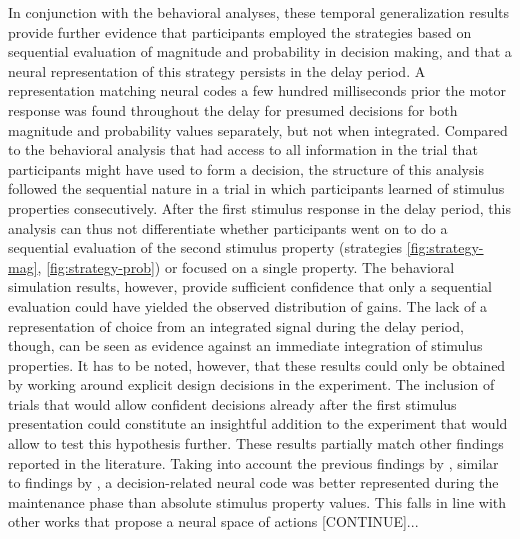 In conjunction with the behavioral analyses, these temporal generalization results provide further evidence that participants employed the strategies based on sequential evaluation of magnitude and probability in decision making, and that a neural representation of this strategy persists in the delay period.
A representation matching neural codes a few hundred milliseconds prior the motor response was found throughout the delay for presumed decisions for both magnitude and probability values separately, but not when integrated.
Compared to the behavioral analysis that had access to all information in the trial that participants might have used to form a decision, the structure of this analysis followed the sequential nature in a trial in which participants learned of stimulus properties consecutively.
After the first stimulus response in the delay period, this analysis can thus not differentiate whether participants went on to do a sequential evaluation of the second stimulus property (strategies \ref{fig:strategy-mag}, \ref{fig:strategy-prob}) or focused on a single property.
The behavioral simulation results, however, provide sufficient confidence that only a sequential evaluation could have yielded the observed distribution of gains.
The lack of a representation of choice from an integrated signal during the delay period, though, can be seen as evidence against an immediate integration of stimulus properties.
It has to be noted, however, that these results could only be obtained by working around explicit design decisions in the experiment.
The inclusion of trials that would allow confident decisions already after the first stimulus presentation could constitute an insightful addition to the experiment that would allow to test this hypothesis further.
These results partially match other findings reported in the literature.
Taking into account the previous findings by \citet{kaiserposter}, similar to findings by \citet{hunt2013trial}, a decision-related neural code was better represented during the maintenance phase than absolute stimulus property values.
This falls in line with other works that propose a neural space of actions [CONTINUE]...

\pagebreak

